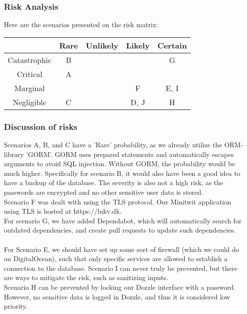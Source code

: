 \subsubsection{Risk Analysis}
Here are the scenarios presented on the risk matrix:
\begin{center}
\begin{tabular}{ |c|c|c|c|c| } 
 \hline
  & Rare & Unlikely & Likely & Certain \\ 
 \hline
 Catastrophic & B &  &  & G\\ 
 \hline
 Critical & A &  &  & \\ 
 \hline
 Marginal & &  &  F& E, I\\ 
 \hline
 Negligible & C &  & D, J & H\\ 
 \hline
\end{tabular}
\end{center}
\subsubsection{Discussion of risks}
Scenarios A, B, and C have a 'Rare' probability, as we already utilize the ORM-library 'GORM'. GORM uses prepared statements and automatically escapes arguments to avoid SQL injection. Without GORM, the probability would be much higher. Specifically for scenario B, it would also have been a good idea to have a backup of the database. The severity is also not a high risk, as the passwords are encrypted and no other sensitive user data is stored.\\
Scenario F was dealt with using the TLS protocol. Our Minitwit application using TLS is hosted at https://lukv.dk.\\
For scenario G, we have added Dependabot, which will automatically search for outdated dependencies, and create pull requests to update such dependencies.
\\\\
For Scenario E, we should have set up some sort of firewall (which we could do on DigitalOcean), such that only specific services are allowed to establish a connection to the database. 
Scenario I can never truly be prevented, but there are ways to mitigate the risk, such as sanitizing inputs. 
\\
Scenario H can be prevented by locking our Dozzle interface with a password. However, no sensitive data is logged in Dozzle, and thus it is considered low priority.